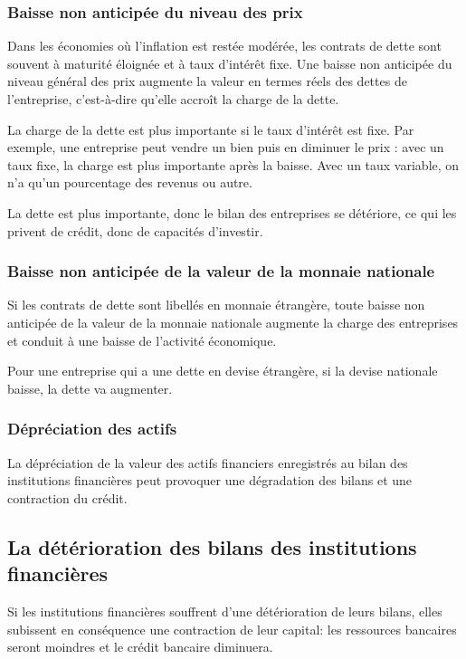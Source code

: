 		\subsubsection{Baisse non anticipée du niveau des prix}
		
		Dans les économies où l'inflation est restée modérée, les contrats de dette sont souvent à maturité éloignée et à taux d'intérêt fixe. Une baisse non anticipée du niveau général des prix augmente la valeur en termes réels des dettes de l'entreprise, c'est-à-dire qu'elle accroît la charge de la dette. 
		
		La charge de la dette est plus importante si le taux d'intérêt est fixe. Par exemple, une entreprise peut vendre un bien puis en diminuer le prix : avec un taux fixe, la charge est plus importante après la baisse. Avec un taux variable, on n'a qu'un pourcentage des revenus ou autre.
		
		La dette est plus importante, donc le bilan des entreprises se détériore, ce qui les privent de crédit, donc de capacités d'investir.
		
		\subsubsection{Baisse non anticipée de la valeur de la monnaie nationale}
		
		Si les contrats de dette sont libellés en monnaie étrangère, toute baisse non anticipée de la valeur de la monnaie nationale augmente la charge des entreprises et conduit à une baisse de l'activité économique.
		
		Pour une entreprise qui a une dette en devise étrangère, si la devise nationale baisse, la dette va augmenter.
		
		\subsubsection{Dépréciation des actifs}
		
		La dépréciation de la valeur des actifs financiers enregistrés au bilan des institutions financières peut provoquer une dégradation des bilans et une contraction du crédit.
		
	\subsection{La détérioration des bilans des institutions 
financières}

	Si les institutions financières souffrent d'une détérioration de leurs bilans, elles subissent en conséquence une contraction de leur capital: les ressources bancaires seront moindres et le crédit bancaire diminuera.
	
